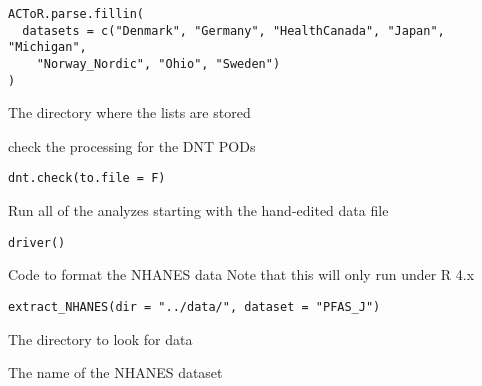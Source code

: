 \documentclass[letterpaper]{book}
\begin{document}
%
\begin{Usage}
\begin{verbatim}
ACToR.parse.fillin(
  datasets = c("Denmark", "Germany", "HealthCanada", "Japan", "Michigan",
    "Norway_Nordic", "Ohio", "Sweden")
)
\end{verbatim}
\end{Usage}
%
\begin{Arguments}
\begin{ldescription}
\item[\code{dir}] The directory where the lists are stored
\end{ldescription}
\end{Arguments}
%
\begin{Description}\relax
check the processing for the DNT PODs
\end{Description}
%
\begin{Usage}
\begin{verbatim}
dnt.check(to.file = F)
\end{verbatim}
\end{Usage}
%
\begin{Description}\relax
Run all of the analyzes starting with the hand-edited data file
\end{Description}
%
\begin{Usage}
\begin{verbatim}
driver()
\end{verbatim}
\end{Usage}
%
\begin{Description}\relax
Code to format the NHANES data
Note that this will only run under R 4.x
\end{Description}
%
\begin{Usage}
\begin{verbatim}
extract_NHANES(dir = "../data/", dataset = "PFAS_J")
\end{verbatim}
\end{Usage}
%
\begin{Arguments}
\begin{ldescription}
\item[\code{dir}] The directory to look for data

\item[\code{dataset}] The name of the NHANES dataset
\end{ldescription}
\end{Arguments}
\end{document}
